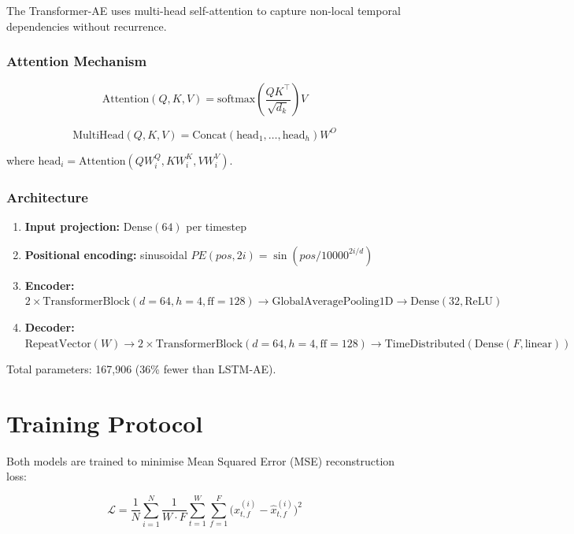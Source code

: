 \documentclass[conference]{IEEEtran}
\begin{document}
The Transformer-AE uses multi-head self-attention to capture non-local temporal dependencies
without recurrence.

\subsubsection{Attention Mechanism}

\begin{equation}
  \text{Attention}(Q,K,V) = \text{softmax}\!\left(\frac{QK^\top}{\sqrt{d_k}}\right)V
\end{equation}

\begin{equation}
  \text{MultiHead}(Q,K,V) = \text{Concat}(\text{head}_1,\ldots,\text{head}_h)W^O
\end{equation}

where $\text{head}_i = \text{Attention}(QW_i^Q, KW_i^K, VW_i^V)$.

\subsubsection{Architecture}

\begin{enumerate}
  \item \textbf{Input projection:} $\text{Dense}(64)$ per timestep
  \item \textbf{Positional encoding:} sinusoidal $PE(pos,2i) = \sin(pos/10000^{2i/d})$
  \item \textbf{Encoder:} $2 \times \text{TransformerBlock}(d=64, h=4, \text{ff}=128)
        \to \text{GlobalAveragePooling1D} \to \text{Dense}(32, \text{ReLU})$
  \item \textbf{Decoder:} $\text{RepeatVector}(W)
        \to 2 \times \text{TransformerBlock}(d=64, h=4, \text{ff}=128)
        \to \text{TimeDistributed}(\text{Dense}(F, \text{linear}))$
\end{enumerate}

Total parameters: 167,906 (36\% fewer than LSTM-AE).

\section{Training Protocol}

Both models are trained to minimise Mean Squared Error (MSE) reconstruction loss:

\begin{equation}
  \mathcal{L} = \frac{1}{N} \sum_{i=1}^{N} \frac{1}{W \cdot F}
                \sum_{t=1}^{W} \sum_{f=1}^{F}
                \bigl(x_{t,f}^{(i)} - \hat{x}_{t,f}^{(i)}\bigr)^2
\end{equation}
\end{document}
